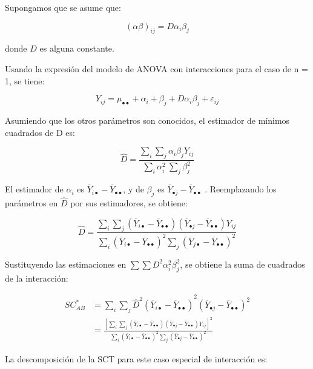 \documentclass[]{book}
\theoremstyle{definition}
\theoremstyle{definition}
\theoremstyle{definition}
\theoremstyle{remark}
\begin{document}
Supongamos que se asume que:

\[
\left( \alpha\beta \right)_{ij} = D\alpha_{i}\beta_{j}
\]

donde \(D\) es alguna constante.

Usando la expresión del modelo de ANOVA con interacciones para el caso
de n = 1, se tiene:

\[
Y_{ij} = \mu_{\bullet \bullet} + \alpha_{i} + \beta_{j} + D\alpha_{i}\beta_{j} + \varepsilon_{ij}
\]

Asumiendo que los otros parámetros son conocidos, el estimador de
mínimos cuadrados de D es:

\[
\hat{D} = \frac{\sum_{i}^{}{\sum_{j}^{}{\alpha_{i}\beta_{j}Y_{ij}}}}{\sum_{i}^{}\alpha_{i}^{2}\ \sum_{j}^{}\beta_{j}^{2}}
\]

El estimador de \(\alpha_{i}\) es
\(\overline{Y}_{i \bullet} - \overline{Y}_{\bullet \bullet}\), y de
\(\beta_{j}\) es
\(\overline{Y}_{\bullet j} - \overline{Y}_{\bullet\bullet}\) .
Reemplazando los parámetros en \(\hat{D}\) por sus estimadores, se
obtiene:

\[
\hat{D} = \frac{\sum_{i}^{}{\sum_{j}^{}{\left( {\overline{Y}_{i \bullet}} - {\overline{Y}_{\bullet \bullet}} \right)\left( {\overline{Y}_{\bullet j}} - {\overline{Y}_{\bullet \bullet}} \right)Y_{ij}}}}{\sum_{i}{\left ({\overline{Y}_{i \bullet}} - \overline{Y}_{\bullet \bullet} \right )}^2\sum_{j}{\left ({\overline{Y}_{j \bullet}} - \overline{Y}_{\bullet \bullet} \right )}^2}
\]

Sustituyendo las estimaciones en
\(\sum\sum D^{2}\alpha_{i}^{2}\beta_{j}^{2}\), se obtiene la suma de
cuadrados de la interacción:

\[
\begin{aligned}
SC_{AB}^{*} & = \sum_{i}^{}{\sum_{j}^{}{{{\hat{D}}^{2}\left( \overline{Y}_{i \bullet} - \overline{Y}_{\bullet \bullet} \right)}^{2}\left( \overline{Y}_{\bullet j} - \overline{Y}_{\bullet \bullet} \right)^{2}}} \\
& =  \frac{{\left\lbrack\sum_i\sum_j\left(\overline{Y}_{i\bullet} -\overline{Y}_{\bullet\bullet} \right ) \left ( \overline{Y}_{\bullet j} -\overline{Y}_{\bullet\bullet} \right )Y_{ij}\right\rbrack }^{2}}{\sum_i\left ( \overline{Y}_{i\bullet} -\overline{Y}_{\bullet\bullet}\right )^2\sum_j\left ( \overline{Y}_{\bullet j} -\overline{Y}_{\bullet\bullet}\right )^2}
\end{aligned}
\]

La descomposición de la SCT para este caso especial de interacción es:
\end{document}
